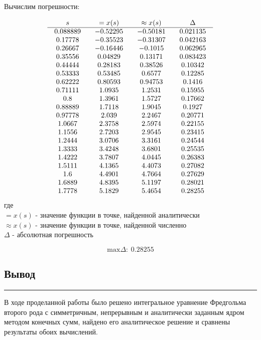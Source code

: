 \documentclass[a4paper, 14pt]{extarticle}
\begin{document}
\newpage

Вычислим погрешности:

\begin{equation*}
    \setlength{\arraycolsep}{10pt}
    \begin{array}{c c c c}
    s & =x(s) & \approx x(s) & \Delta \\
    \hline
    0.088889 & -0.52295 & -0.50181 & 0.021135 \\
    0.17778 & -0.35523 & -0.31307 & 0.042163 \\
    0.26667 & -0.16446 & -0.1015 & 0.062965 \\
    0.35556 & 0.04829 & 0.13171 & 0.083423 \\
    0.44444 & 0.28183 & 0.38526 & 0.10342 \\
    0.53333 & 0.53485 & 0.6577 & 0.12285 \\
    0.62222 & 0.80593 & 0.94753 & 0.1416 \\
    0.71111 & 1.0935 & 1.2531 & 0.15955 \\
    0.8 & 1.3961 & 1.5727 & 0.17662 \\
    0.88889 & 1.7118 & 1.9045 & 0.1927 \\
    0.97778 & 2.039 & 2.2467 & 0.20771 \\
    1.0667 & 2.3758 & 2.5974 & 0.22155 \\
    1.1556 & 2.7203 & 2.9545 & 0.23415 \\
    1.2444 & 3.0706 & 3.3161 & 0.24544 \\
    1.3333 & 3.4248 & 3.6801 & 0.25535 \\
    1.4222 & 3.7807 & 4.0445 & 0.26383 \\
    1.5111 & 4.1365 & 4.4073 & 0.27082 \\
    1.6 & 4.4901 & 4.7664 & 0.27629 \\
    1.6889 & 4.8395 & 5.1197 & 0.28021 \\
    1.7778 & 5.1829 & 5.4654 & 0.28255 \\
    \end{array}
\end{equation*}
где\\
$=x(s)$ - значение функции в точке, найденной аналитически\\ 
$\approx x(s)$ - значение функции в точке, найденной численно\\ 
$\Delta$ - абсолютная погрешность 

\begin{equation*}
    \text{max} \Delta: \hspace{3pt} 0.28255
\end{equation*}

\subsection*{Вывод}\vspace{-20pt}\rule{\linewidth}{0.1mm}

В ходе проделанной работы было решено интегральное уравнение Фредгольма 
второго рода с симметричным, непрерывным и аналитически заданным ядром 
методом конечных сумм, найдено его аналитическое решение и сравнены результаты 
обоих вычислений.
\end{document}
